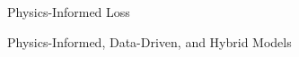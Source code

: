 \documentclass[8pt]{beamer}
\begin{document}
\begin{frame}{Physics-Informed Loss}
\end{frame}

\begin{frame}{Physics-Informed, Data-Driven, and Hybrid Models}
	
\end{frame}
\end{document}
